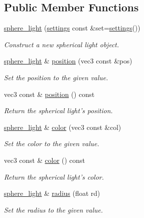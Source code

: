 \subsection*{Public Member Functions}
\begin{DoxyCompactItemize}
\item 
\hyperlink{classgfx_1_1sphere__light_ac05eaef4240b38dbddd2948d8eae1624}{sphere\-\_\-light} (\hyperlink{classgfx_1_1sphere__light_1_1settings}{settings} const \&set=\hyperlink{classgfx_1_1sphere__light_1_1settings}{settings}())
\begin{DoxyCompactList}\small\item\em Construct a new spherical light object. \end{DoxyCompactList}\item 
\hyperlink{classgfx_1_1sphere__light}{sphere\-\_\-light} \& \hyperlink{classgfx_1_1sphere__light_a730df6d3bb9b3f0a0e9738287f6eed03}{position} (vec3 const \&pos)
\begin{DoxyCompactList}\small\item\em Set the position to the given value. \end{DoxyCompactList}\item 
vec3 const \& \hyperlink{classgfx_1_1sphere__light_a5dc1cd2b9353969f47504edacd66a77b}{position} () const 
\begin{DoxyCompactList}\small\item\em Return the spherical light's position. \end{DoxyCompactList}\item 
\hyperlink{classgfx_1_1sphere__light}{sphere\-\_\-light} \& \hyperlink{classgfx_1_1sphere__light_adcec6113e1eccc899361ba1d164038de}{color} (vec3 const \&col)
\begin{DoxyCompactList}\small\item\em Set the color to the given value. \end{DoxyCompactList}\item 
vec3 const \& \hyperlink{classgfx_1_1sphere__light_acb0db741c12a0e3bbcf7b4895a6799e5}{color} () const 
\begin{DoxyCompactList}\small\item\em Return the spherical light's color. \end{DoxyCompactList}\item 
\hyperlink{classgfx_1_1sphere__light}{sphere\-\_\-light} \& \hyperlink{classgfx_1_1sphere__light_a1b61a96e7fd6765a2f16396bf4d17cc0}{radius} (float rd)
\begin{DoxyCompactList}\small\item\em Set the radius to the given value. \end{DoxyCompactList}\item 

\end{DoxyCompactItemize}
